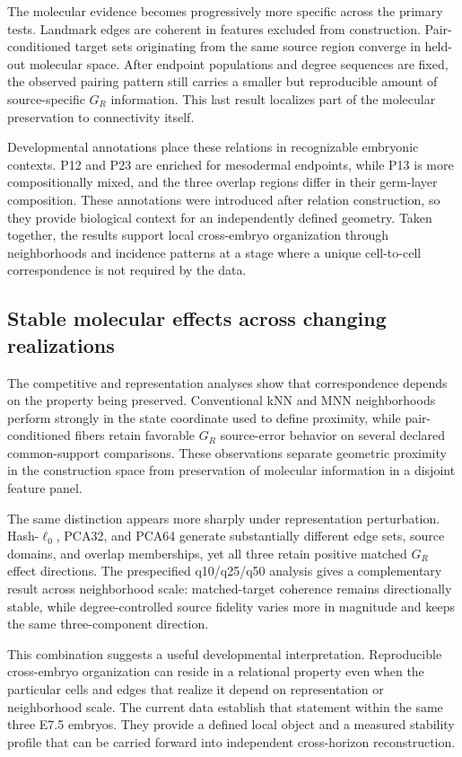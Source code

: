 \documentclass[11pt]{article}
\begin{document}
The molecular evidence becomes progressively more specific across the primary tests. Landmark edges are coherent in features excluded from construction. Pair-conditioned target sets originating from the same source region converge in held-out molecular space. After endpoint populations and degree sequences are fixed, the observed pairing pattern still carries a smaller but reproducible amount of source-specific \(G_R\) information. This last result localizes part of the molecular preservation to connectivity itself.

Developmental annotations place these relations in recognizable embryonic contexts. P12 and P23 are enriched for mesodermal endpoints, while P13 is more compositionally mixed, and the three overlap regions differ in their germ-layer composition. These annotations were introduced after relation construction, so they provide biological context for an independently defined geometry. Taken together, the results support local cross-embryo organization through neighborhoods and incidence patterns at a stage where a unique cell-to-cell correspondence is not required by the data.

\subsection{Stable molecular effects across changing realizations}

The competitive and representation analyses show that correspondence depends on the property being preserved. Conventional kNN and MNN neighborhoods perform strongly in the state coordinate used to define proximity, while pair-conditioned fibers retain favorable \(G_R\) source-error behavior on several declared common-support comparisons. These observations separate geometric proximity in the construction space from preservation of molecular information in a disjoint feature panel.

The same distinction appears more sharply under representation perturbation. Hash-\(\ell_0\), PCA32, and PCA64 generate substantially different edge sets, source domains, and overlap memberships, yet all three retain positive matched \(G_R\) effect directions. The prespecified q10/q25/q50 analysis gives a complementary result across neighborhood scale: matched-target coherence remains directionally stable, while degree-controlled source fidelity varies more in magnitude and keeps the same three-component direction.

This combination suggests a useful developmental interpretation. Reproducible cross-embryo organization can reside in a relational property even when the particular cells and edges that realize it depend on representation or neighborhood scale. The current data establish that statement within the same three E7.5 embryos. They provide a defined local object and a measured stability profile that can be carried forward into independent cross-horizon reconstruction.
\end{document}
